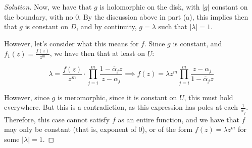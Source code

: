 \documentclass[10pt]{article}
\begin{document}
\begin{proof}[Solution]
Now, we have that $g$ is holomorphic on the disk, with $|g|$ constant on the boundary, with no 0. By the discussion above in part (a), this implies then that $g$ is constant on $D$, and by continuity, $g = \lambda$ such that $|\lambda| = 1$. 

However, let's consider what this means for $f$. Since $g$ is constant, and $f_1(z) = \frac{f(z)}{z^m}$, we have then that at least on $U$:

$$\lambda = \frac{f(z)}{z^m} \cdot \prod_{j=i}^m \frac{1 - \overline{\alpha}_j z}{z - \alpha_j} \implies f(z) = \lambda z^m \prod_{j=i}^m \frac{z - \alpha_j}{1 - \overline{\alpha}_j z}$$

However, since $g$ is meromorphic, since it is constant on $U$, this must hold everywhere. But this is a contradiction, as this expression has poles at each $\frac{1}{\overline{\alpha}_j}$. Therefore, this case cannot satisfy $f$ as an entire function, and we have that $f$ may only be constant (that is, exponent of 0), or of the form $f(z) = \lambda z^m$ for some $|\lambda| = 1$.


\end{proof}
\end{document}
